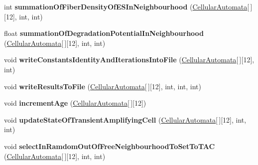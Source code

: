 \begin{DoxyCompactItemize}
\item 
\hypertarget{class_cellular_automata_a1fe3b73a313c9baafe78074906152430}{}int {\bfseries summation\+Of\+Fiber\+Density\+Of\+E\+S\+In\+Neighbourhood} (\hyperlink{class_cellular_automata}{Cellular\+Automata}\mbox{[}$\,$\mbox{]}\mbox{[}12\mbox{]}, int, int)\label{class_cellular_automata_a1fe3b73a313c9baafe78074906152430}

\item 
\hypertarget{class_cellular_automata_a9a13909e55d2cebda84301f169f735af}{}float {\bfseries summation\+Of\+Degradation\+Potential\+In\+Neighbourhood} (\hyperlink{class_cellular_automata}{Cellular\+Automata}\mbox{[}$\,$\mbox{]}\mbox{[}12\mbox{]}, int, int)\label{class_cellular_automata_a9a13909e55d2cebda84301f169f735af}

\item 
\hypertarget{class_cellular_automata_a827bb0b4c6ec3cc3b77db6f8c8aecfa3}{}void {\bfseries write\+Constants\+Identity\+And\+Iterations\+Into\+File} (\hyperlink{class_cellular_automata}{Cellular\+Automata}\mbox{[}$\,$\mbox{]}\mbox{[}12\mbox{]}, int)\label{class_cellular_automata_a827bb0b4c6ec3cc3b77db6f8c8aecfa3}

\item 
\hypertarget{class_cellular_automata_a7c993fea63563fb801c453d4a652b17a}{}void {\bfseries write\+Results\+To\+File} (\hyperlink{class_cellular_automata}{Cellular\+Automata}\mbox{[}$\,$\mbox{]}\mbox{[}12\mbox{]}, int, int, int)\label{class_cellular_automata_a7c993fea63563fb801c453d4a652b17a}

\item 
\hypertarget{class_cellular_automata_a3d85c64c051171540b29c78d98c0d25a}{}void {\bfseries increment\+Age} (\hyperlink{class_cellular_automata}{Cellular\+Automata}\mbox{[}$\,$\mbox{]}\mbox{[}12\mbox{]})\label{class_cellular_automata_a3d85c64c051171540b29c78d98c0d25a}

\item 
\hypertarget{class_cellular_automata_ad4bc780c7d4d287d5b3a217453d943fa}{}void {\bfseries update\+State\+Of\+Transient\+Amplifying\+Cell} (\hyperlink{class_cellular_automata}{Cellular\+Automata}\mbox{[}$\,$\mbox{]}\mbox{[}12\mbox{]}, int, int)\label{class_cellular_automata_ad4bc780c7d4d287d5b3a217453d943fa}

\item 
\hypertarget{class_cellular_automata_a13ec116ac710a92378efa099a9c952c9}{}void {\bfseries select\+In\+Ramdom\+Out\+Of\+Free\+Neighbourhood\+To\+Set\+To\+T\+A\+C} (\hyperlink{class_cellular_automata}{Cellular\+Automata}\mbox{[}$\,$\mbox{]}\mbox{[}12\mbox{]}, int, int)\label{class_cellular_automata_a13ec116ac710a92378efa099a9c952c9}


\end{DoxyCompactItemize}
